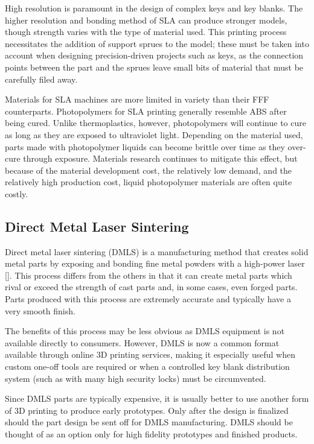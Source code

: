 \documentclass{acm_proc_article-sp}
\begin{document}
High resolution is paramount in the design of complex keys and key blanks. The higher resolution and bonding method of SLA can produce stronger models, though strength varies with the type of material used. This printing process necessitates the addition of support sprues to the model; these must be taken into account when designing precision-driven projects such as keys, as the connection points between the part and the sprues leave small bits of material that must be carefully filed away.

Materials for SLA machines are more limited in variety than their FFF counterparts. Photopolymers for SLA printing generally resemble ABS after being cured. Unlike thermoplastics, however, photopolymers will continue to cure as long as they are exposed to ultraviolet light. Depending on the material used, parts made with photopolymer liquids can become brittle over time as they over-cure through exposure. Materials research continues to mitigate this effect, but because of the material development cost, the relatively low demand, and the relatively high production cost, liquid photopolymer materials are often quite costly.

\subsection{Direct Metal Laser Sintering}
Direct metal laser sintering (DMLS) is a manufacturing method that creates solid metal parts by exposing and bonding fine metal powders with a high-power laser [\citealt{DAS}]. This process differs from the others in that it can create metal parts which rival or exceed the strength of cast parts and, in some cases, even forged parts. Parts produced with this process are extremely accurate and typically have a very smooth finish.

The benefits of this process may be less obvious as DMLS equipment is not available directly to consumers. However, DMLS is now a common format available through online 3D printing services, making it especially useful when custom one-off tools are required or when a controlled key blank distribution system (such as with many high security locks) must be circumvented.

Since DMLS parts are typically expensive, it is usually better to use another form of 3D printing to produce early prototypes. Only after the design is finalized should the part design be sent off for DMLS manufacturing. DMLS should be thought of as an option only for high fidelity prototypes and finished products.
\end{document}
